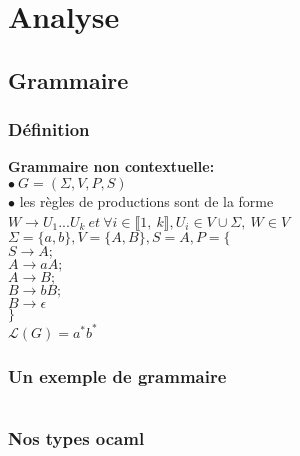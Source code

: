 \section{Analyse}

\subsection{Grammaire}
\begin{frame}
    \frametitle{Définition \esp}

    \textbf{Grammaire non contextuelle:}\\
    $\bullet \ G=(\Sigma, V, P, S)$\\
    $\bullet$ les règles de productions sont de la forme $W \rightarrow U_1...U_k\ et\ \forall i \in \llbracket1,\ k\rrbracket, U_i \in V \cup \Sigma , \ W \in V $
    \vspace{0.5cm}
    $ $\\
    {
        $\Sigma = \{a,b\}, V = \{A,B\}, S = A, P = \{$\\
        $ S \rightarrow A ;$\\
        $ A \rightarrow aA ;$\\
        $ A \rightarrow B ;$\\
        $ B \rightarrow bB ;$\\
        $ B \rightarrow \epsilon$\\
        $\}$\\
        $\mathcal{L} (G) = a^*b^*$
    }
\end{frame}

\begin{frame}
    \frametitle{Un exemple de grammaire\esp}
    \inputminted[breaklines, fontsize=\small]{text}{static/Grammaire_exemple.txt}
\end{frame}

\begin{frame}
    \frametitle{Nos types ocaml\esp}
    \noindent
    \begin{minipage}[t]{0.48\textwidth}
    \end{minipage}
        \hfill
    \begin{minipage}[t]{0.48\textwidth}
    \end{minipage}

\end{frame}



